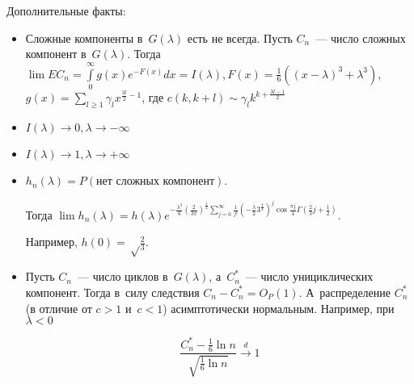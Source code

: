 \documentclass{article}
\begin{document}
Дополнительные факты:
\begin{itemize}
	\item Сложные компоненты в~$G(\lambda)$ есть не всегда. Пусть $C_n$~--- число сложных компонент
		в~$G(\lambda)$. Тогда $\lim EC_n = \int\limits_0^\infty g(x) e^{-F(x)} dx = I(\lambda), F(x) =
		\frac{1}{6}((x-\lambda)^3 + \lambda^3)$, $g(x) = \sum\limits_{l\ge 1} \gamma_l
		x^{\frac{3l}{2}-1}$, где $c(k, k + l) \sim \gamma_l k^{k + \frac{3l-1}{2}}$
	\item $I(\lambda) \rightarrow 0, \lambda \rightarrow -\infty$
	\item $I(\lambda) \rightarrow 1, \lambda \rightarrow +\infty$

	\item $h_n(\lambda) = P(\text{нет сложных компонент})$.

		Тогда $\lim h_n(\lambda) = h(\lambda)
		e^{-\frac{\lambda^3}{6} \left( \frac{2}{3\pi} \right)^\frac{1}{2} \sum\limits_{j=0}^\infty
		\frac{1}{j!} \left( -\frac{\lambda}{2} 3^\frac{2}{3} \right)^j \cos \frac{\pi j}{4}
		\Gamma\left(\frac{2}{3}j + \frac{1}{2} \right)}$.

		Например, $h(0) = \sqrt\frac{2}{3}$.

	\item Пусть $C_n$~--- число циклов в~$G(\lambda)$, а~$C_n^\ast$~--- число унициклических
		компонент. Тогда в~силу следствия $C_n - C_n^\ast = O_P(1)$. А~распределение $C_n^\ast$ (в
		отличие от $c > 1$ и~$c < 1$) асимптотически нормальным. Например, при $\lambda < 0$

		$$\frac{C_n^\ast - \frac{1}{6}\ln n}{\sqrt{\frac{1}{6}\ln n}} \overset{d}\rightarrow 1$$
\end{itemize}
\end{document}
